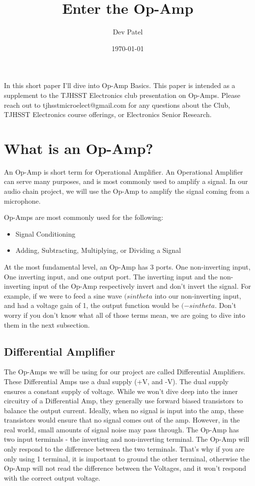 \documentclass[letterpaper,12pt]{article}
\begin{document}
\title{Enter the Op-Amp}
\author{Dev Patel}
\date{\today}
\maketitle


In this short paper I'll dive into Op-Amp Basics. This paper is intended as a supplement to the TJHSST Electronics club presentation on Op-Amps. Please reach out to tjhsstmicroelect@gmail.com for any questions about the Club, TJHSST Electronics course offerings, or Electronics Senior Research.


\section{What is an Op-Amp?}

An Op-Amp is short term for Operational Amplifier. An Operational Amplifier can serve many purposes, and is most commonly used to amplify a signal. In our audio chain project, we will use the Op-Amp to amplify the signal coming from a microphone. 

Op-Amps are most commonly used for the following:
\begin{itemize}
  \item Signal Conditioning
  \item Adding, Subtracting, Multiplying, or Dividing a Signal
\end{itemize}

At the most fundamental level, an Op-Amp has 3 ports. One non-inverting input, One inverting input, and one output port. The inverting input and the non-inverting input of the Op-Amp respectively invert and don't invert the signal. For example, if we were to feed a sine wave \begin{math}(sin{theta}\end{math} into our non-inverting input, and had a voltage gain of 1, the output function would be \begin{math}(-sin{theta}\end{math}. Don't worry if you don't know what all of those terms mean, we are going to dive into them in the next subsection.

\subsection{Differential Amplifier}
The Op-Amps we will be using for our project are called Differential Amplifiers. These Differential Amps use a dual supply (+V, and -V). The dual supply ensures a constant supply of voltage. While we won't dive deep into the inner circuitry of a Differential Amp, they generally use forward biased transistors to balance the output current. Ideally, when no signal is input into the amp, these transistors would ensure that no signal comes out of the amp. However, in the real world, small amounts of signal noise may pass through. The Op-Amp has two input terminals - the inverting and non-inverting terminal. The Op-Amp will only respond to the difference between the two terminals. That's why if you are only using 1 terminal, it is important to ground the other terminal, otherwise the Op-Amp will not read the difference between the Voltages, and it won't respond with the correct output voltage.
\end{document}
